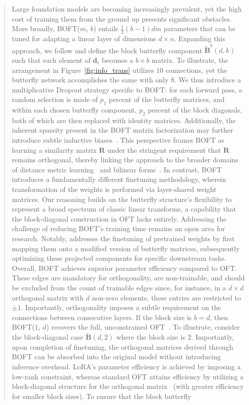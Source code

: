\begin{itemize}[leftmargin=*,nosep]
\begin{theorem}
\begin{abstract}
Large foundation models are becoming increasingly prevalent, yet the high cost of training them from the ground up presents significant obstacles. More broadly, BOFT($m$, $b$) entails $\frac{1}{2}(b-1)dm$ parameters that can be tuned for adapting a linear layer of dimensions $d \times n$. Expanding this approach, we follow \cite{chen2022pixelated} and define the block butterfly component $\tilde{\bm{B}}^b(d,k)$ such that each element of $\bm{d}_i$ becomes a $b\times b$ matrix. To illustrate, the arrangement in Figure~\ref{fig:info_trans} utilizes $10$ connections, yet the butterfly network accomplishes the same with only $8$. We thus introduce a multiplicative Dropout strategy specific to BOFT: for each forward pass, a random selection is made of $p_1$ percent of the butterfly matrices, and within each chosen butterfly component, $p_2$ percent of the block diagonals, both of which are then replaced with identity matrices. Additionally, the inherent sparsity present in the BOFT matrix factorization may further introduce subtle inductive biases~\cite{gunasekar2017implicit,li2018algorithmic,liu2019neural}. This perspective frames BOFT as learning a similarity matrix $\bm{R}$ under the stringent requirement that $\bm{R}$ remains orthogonal, thereby linking the approach to the broader domains of distance metric learning~\cite{xing2002distance} and bilinear forms~\cite{roman2005advanced}. In contrast, BOFT introduces a fundamentally different finetuning methodology, wherein transformation of the weights is performed via layer-shared weight matrices. Our reasoning builds on the butterfly structure’s flexibility to represent a broad spectrum of classic linear transforms, a capability that the block-diagonal construction in OFT lacks entirely. Addressing the challenge of reducing BOFT’s training time remains an open area for research. Notably, \cite{dao2022monarch} addresses the finetuning of pretrained weights by first mapping them onto a modified version of butterfly matrices, subsequently optimizing these projected components for specific downstream tasks. Overall, BOFT achieves superior parameter efficiency compared to OFT. These edges are mandatory for orthogonality, are non-trainable, and should be excluded from the count of trainable edges since, for instance, in a $d\times d$ orthogonal matrix with $d$ non-zero elements, these entries are restricted to $\pm 1$. Importantly, orthogonality imposes a subtle requirement on the connections between consecutive layers. If the block size is $b = d$, then BOFT($1$, $d$) recovers the full, unconstrained OFT~\cite{qiu2023controlling}. To illustrate, consider the block-diagonal case $\tilde{\bm{B}}(d,2)$ where the block size is $2$. Importantly, upon completion of finetuning, the orthogonal matrices derived through BOFT can be absorbed into the original model without introducing inference overhead. LoRA’s parameter efficiency is achieved by imposing a low-rank constraint, whereas standard OFT attains efficiency by utilizing a block-diagonal structure for the orthogonal matrix~\cite{qiu2023controlling} (with greater efficiency for smaller block sizes). To ensure that the block butterfly 
\end{abstract}
\end{theorem}
\end{itemize}
